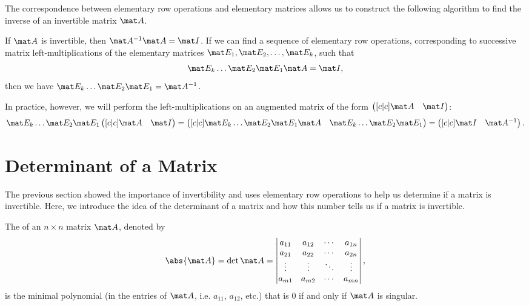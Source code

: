 The correspondence between elementary row operations and elementary matrices allows us to construct the following algorithm to find the inverse of an invertible matrix $\mat A$.

\begin{recipe}
    If $\mat A$ is invertible, then $\mat A^{-1} \mat A = \mat I$. If we can find a sequence of elementary row operations, corresponding to successive matrix left-multiplications of the elementary matrices $\mat E_1, \mat E_2, \dots, \mat E_k$, such that \[\mat E_k \dots \mat E_2 \mat E_1 \mat A = \mat I,\] then we have $\mat E_k \dots \mat E_2 \mat E_1 = \mat A^{-1}$.
\end{recipe}

In practice, however, we will perform the left-multiplications on an augmented matrix of the form $\begin{pmatrix}[c|c] \mat A & \mat I\end{pmatrix}$: \[\mat E_k \dots \mat E_2 \mat E_1 \begin{pmatrix}[c|c] \mat A & \mat I\end{pmatrix} = \begin{pmatrix}[c|c] \mat E_k \dots \mat E_2 \mat E_1 \mat A & \mat E_k \dots \mat E_2 \mat E_1\end{pmatrix} = \begin{pmatrix}[c|c]\mat I & \mat A^{-1}\end{pmatrix}.\]

\section{Determinant of a Matrix}

The previous section showed the importance of invertibility and uses elementary row operations to help us determine if a matrix is invertible. Here, we introduce the idea of the determinant of a matrix and how this number tells us if a matrix is invertible.

\begin{definition}
    The  of an $n \times n$ matrix $\mat A$, denoted by \[\abs{\mat A} = \det{\mat A} = \begin{vmatrix}a_{11} & a_{12} & \cdots & a_{1n} \\ a_{21} & a_{22} & \cdots & a_{2n} \\ \vdots & \vdots & \ddots & \vdots \\ a_{m1} & a_{m2} & \cdots & a_{mn} \end{vmatrix},\] is the minimal polynomial (in the entries of $\mat A$, i.e. $a_{11}$, $a_{12}$, etc.) that is 0 if and only if $\mat A$ is singular.
\end{definition}

